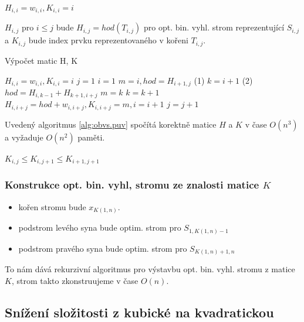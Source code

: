 \begin{algorithmic}
  \STATE $H_{i,i} = w_{i,i}, K_{i,i} = i$
\ENDFOR
\end{algorithmic}

$H_{i,j}$ pro $i \leq j$ bude $H_{i,j} = hod(T_{i,j})$ pro opt. bin. vyhl.
strom reprezentující $S_{i,j}$ a $K_{i,j}$ bude index prvku
reprezentovaného v kořeni $T_{i,j}$.

\begin{algorithm}[!htb]
\caption{Výpočet matic H, K}
\label{alg:obvs.puv}
\begin{algorithmic}
  \STATE $H_{i,i} = w_{i,i}, K_{i,i} = i$
\ENDFOR
\STATE $j = 1$
  \STATE $i = 1$
    \STATE $m = i, hod = H_{i+1,j}$ (1)
    \STATE $k = i+1$  (2)
        \STATE $hod = H_{i,k-1}+H_{k+1,i+j}$
	\STATE $m = k$
      \ENDIF
      \STATE $k = k + 1$
    \ENDWHILE
    \STATE $H_{i,i+j} = hod + w_{i,i+j}, K_{i,i+j} = m, i = i + 1$
  \ENDWHILE
  \STATE $j = j + 1$
\ENDWHILE
\end{algorithmic}
\end{algorithm}

\begin{theorem}
Uvedený algoritmus \ref{alg:obvs.puv} spočítá korektně matice $H$ a $K$ 
v čase $O(n^3)$ a vyžaduje $O(n^2)$ paměti.
\end{theorem}

$K_{i,j} \leq K_{i,j+1} \leq K_{i+1,j+1}$


\subsubsection{Konstrukce opt. bin. vyhl, stromu ze znalosti matice $K$}
\begin{itemize}
\item kořen stromu bude $x_{K(1,n)}$.
\item podstrom levého syna bude optim. strom pro $S_{1,K(1,n)-1}$
\item podstrom pravého syna bude optim. strom pro $S_{K(1,n)+1,n}$
\end{itemize}

To nám dává rekurzivní algoritmus pro výstavbu opt. bin. vyhl. stromu z
matice $K$, strom takto zkonstruujeme v čase $O(n)$.


\subsection{Snížení složitosti z kubické na kvadratickou}

